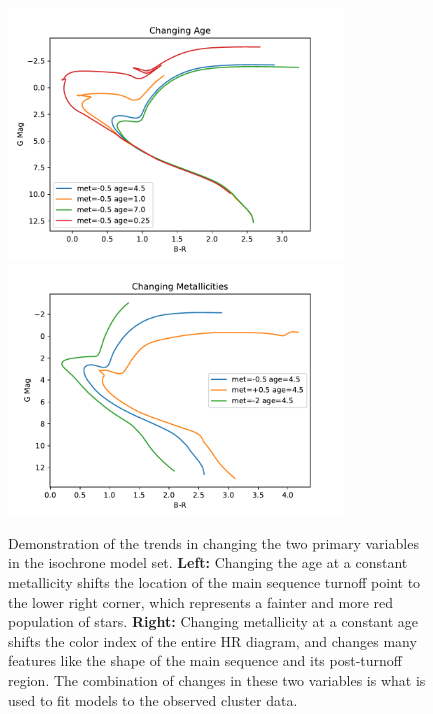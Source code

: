 \documentclass[onecolumn,table,xcdraw,super]{aastex631}
\begin{document}
\begin{figure}[]
    \centering
      \includegraphics[width=3.5in]{figures/iso_age.pdf}
      \includegraphics[width=3.5in]{figures/iso_metallicity.pdf}
    \caption{Demonstration of the trends in changing the two primary variables in the isochrone model set. \textbf{Left:} Changing the age at a constant metallicity shifts the location of the main sequence turnoff point to the lower right corner, which represents a fainter and more red population of stars. \textbf{Right:} Changing metallicity at a constant age shifts the color index of the entire HR diagram, and changes many features like the shape of the main sequence and its post-turnoff region. The combination of changes in these two variables is what is used to fit models to the observed cluster data.}
    \label{fig:iso_trends}
\end{figure}
\end{document}
